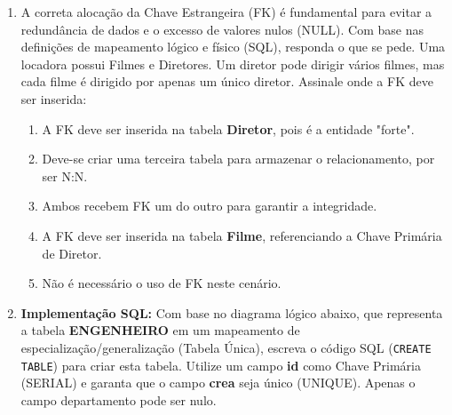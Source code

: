 \documentclass[12pt,a4paper]{article}
\begin{document}
\begin{enumerate}
\begin{enumerate}[label=\Alph*)]
    \item {}
    
\end{enumerate}
    \item A correta alocação da Chave Estrangeira (FK) é fundamental para evitar a redundância de dados e o excesso de valores nulos (NULL). Com base nas definições de mapeamento lógico e físico (SQL), responda o que se pede. Uma locadora possui Filmes e Diretores. Um diretor pode dirigir vários filmes, mas cada filme é dirigido por apenas um único diretor. Assinale onde a FK deve ser inserida:
    \begin{enumerate}[label=\Alph*)]
        \item A FK deve ser inserida na tabela \textbf{Diretor}, pois é a entidade "forte".
        \item Deve-se criar uma terceira tabela para armazenar o relacionamento, por ser N:N.
        \item Ambos recebem FK um do outro para garantir a integridade.
        \item A FK deve ser inserida na tabela \textbf{Filme}, referenciando a Chave Primária de Diretor.
        \item Não é necessário o uso de FK neste cenário.
    \end{enumerate}

    \item \textbf{Implementação SQL:} Com base no diagrama lógico abaixo, que representa a tabela \textbf{ENGENHEIRO} em um mapeamento de especialização/generalização (Tabela Única), escreva o código SQL (\texttt{CREATE TABLE}) para criar esta tabela. Utilize um campo \textbf{id} como Chave Primária (SERIAL) e garanta que o campo \textbf{crea} seja único (UNIQUE). Apenas o campo departamento pode ser nulo.

    \begin{center}
\end{center}
\end{enumerate}
\end{document}
